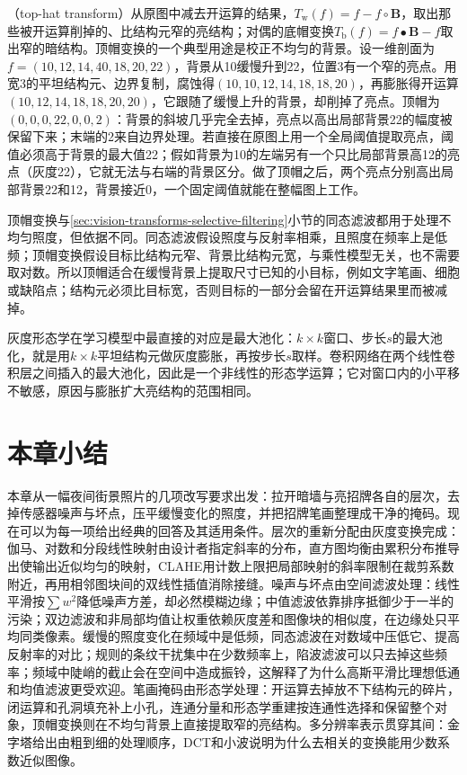 （top-hat transform）从原图中减去开运算的结果，$T_{\mathrm{w}}(f)=f-f\circ\bm{B}$，取出那些被开运算削掉的、比结构元窄的亮结构；对偶的底帽变换$T_{\mathrm{b}}(f)=f\bullet\bm{B}-f$取出窄的暗结构。顶帽变换的一个典型用途是校正不均匀的背景。设一维剖面为$f=(10,12,14,40,18,20,22)$，背景从10缓慢升到22，位置3有一个窄的亮点。用宽3的平坦结构元、边界复制，腐蚀得$(10,10,12,14,18,18,20)$，再膨胀得开运算$(10,12,14,18,18,20,20)$，它跟随了缓慢上升的背景，却削掉了亮点。顶帽为$(0,0,0,22,0,0,2)$：背景的斜坡几乎完全去掉，亮点以高出局部背景22的幅度被保留下来；末端的2来自边界处理。若直接在原图上用一个全局阈值提取亮点，阈值必须高于背景的最大值22；假如背景为10的左端另有一个只比局部背景高12的亮点（灰度22），它就无法与右端的背景区分。做了顶帽之后，两个亮点分别高出局部背景22和12，背景接近0，一个固定阈值就能在整幅图上工作。

顶帽变换与\ref{sec:vision-transforms-selective-filtering}小节的同态滤波都用于处理不均匀照度，但依据不同。同态滤波假设照度与反射率相乘，且照度在频率上是低频；顶帽变换假设目标比结构元窄、背景比结构元宽，与乘性模型无关，也不需要取对数。所以顶帽适合在缓慢背景上提取尺寸已知的小目标，例如文字笔画、细胞或缺陷点；结构元必须比目标宽，否则目标的一部分会留在开运算结果里而被减掉。

灰度形态学在学习模型中最直接的对应是最大池化：$k\times k$窗口、步长$s$的最大池化，就是用$k\times k$平坦结构元做灰度膨胀，再按步长$s$取样。卷积网络在两个线性卷积层之间插入的最大池化，因此是一个非线性的形态学运算；它对窗口内的小平移不敏感，原因与膨胀扩大亮结构的范围相同。

\section{本章小结}
\label{sec:vision-transforms-summary}

本章从一幅夜间街景照片的几项改写要求出发：拉开暗墙与亮招牌各自的层次，去掉传感器噪声与坏点，压平缓慢变化的照度，并把招牌笔画整理成干净的掩码。现在可以为每一项给出经典的回答及其适用条件。层次的重新分配由灰度变换完成：伽马、对数和分段线性映射由设计者指定斜率的分布，直方图均衡由累积分布推导出使输出近似均匀的映射，CLAHE用计数上限把局部映射的斜率限制在裁剪系数附近，再用相邻图块间的双线性插值消除接缝。噪声与坏点由空间滤波处理：线性平滑按$\sum w^2$降低噪声方差，却必然模糊边缘；中值滤波依靠排序抵御少于一半的污染；双边滤波和非局部均值让权重依赖灰度差和图像块的相似度，在边缘处只平均同类像素。缓慢的照度变化在频域中是低频，同态滤波在对数域中压低它、提高反射率的对比；规则的条纹干扰集中在少数频率上，陷波滤波可以只去掉这些频率；频域中陡峭的截止会在空间中造成振铃，这解释了为什么高斯平滑比理想低通和均值滤波更受欢迎。笔画掩码由形态学处理：开运算去掉放不下结构元的碎片，闭运算和孔洞填充补上小孔，连通分量和形态学重建按连通性选择和保留整个对象，顶帽变换则在不均匀背景上直接提取窄的亮结构。多分辨率表示贯穿其间：金字塔给出由粗到细的处理顺序，DCT和小波说明为什么去相关的变换能用少数系数近似图像。

